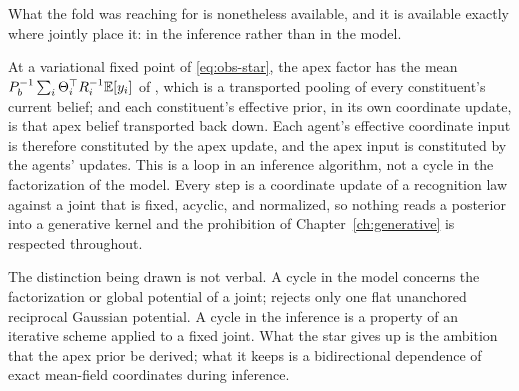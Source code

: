 What the fold was reaching for is nonetheless available, and it is available exactly where  jointly place it: in the inference rather than in the model.

At a variational fixed point of \eqref{eq:obs-star}, the apex factor has the mean $P_b^{-1}\sum_i\Theta_i^{\top}R_i^{-1}\mathbb E[y_i]$ of , which is a transported pooling of every constituent's current belief; and each constituent's effective prior, in its own coordinate update, is that apex belief transported back down. Each agent's effective coordinate input is therefore constituted by the apex update, and the apex input is constituted by the agents' updates. This is a loop in an inference algorithm, not a cycle in the factorization of the model. Every step is a coordinate update of a recognition law against a joint that is fixed, acyclic, and normalized, so nothing reads a posterior into a generative kernel and the prohibition of Chapter~\ref{ch:generative} is respected throughout.

The distinction being drawn is not verbal. A cycle in the model concerns the factorization or global potential of a joint;  rejects only one flat unanchored reciprocal Gaussian potential. A cycle in the inference is a property of an iterative scheme applied to a fixed joint. What the star gives up is the ambition that the apex prior be derived; what it keeps is a bidirectional dependence of exact mean-field coordinates during inference.

